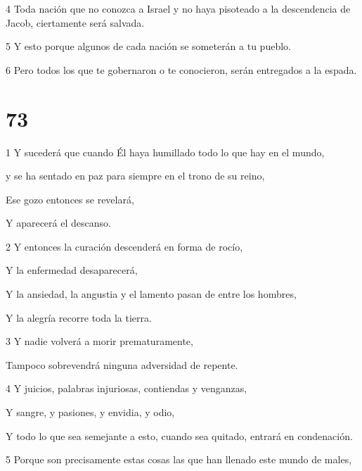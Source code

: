 \par 4 Toda nación que no conozca a Israel y no haya pisoteado a la descendencia de Jacob, ciertamente será salvada.

\par 5 Y esto porque algunos de cada nación se someterán a tu pueblo.

\par 6 Pero todos los que te gobernaron o te conocieron, serán entregados a la espada.

\chapter{73}

\par 1 Y sucederá que cuando Él haya humillado todo lo que hay en el mundo,

\par y se ha sentado en paz para siempre en el trono de su reino,

\par Ese gozo entonces se revelará,

\par Y aparecerá el descanso.

\par 2 Y entonces la curación descenderá en forma de rocío,

\par Y la enfermedad desaparecerá,

\par Y la ansiedad, la angustia y el lamento pasan de entre los hombres,

\par Y la alegría recorre toda la tierra.

\par 3 Y nadie volverá a morir prematuramente,

\par Tampoco sobrevendrá ninguna adversidad de repente.

\par 4 Y juicios, palabras injuriosas, contiendas y venganzas,

\par Y sangre, y pasiones, y envidia, y odio,

\par Y todo lo que sea semejante a esto, cuando sea quitado, entrará en condenación.

\par 5 Porque son precisamente estas cosas las que han llenado este mundo de males,

